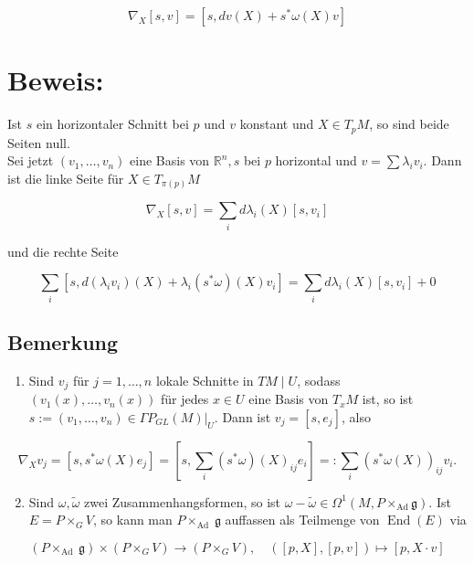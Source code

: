 \documentclass[10pt, letterpaper]{article}
\begin{document}
$$
\nabla_{X}[s, v]=\left[s, d v(X)+s^{*} \omega(X) v\right]
$$

\section*{Beweis:}
Ist $s$ ein horizontaler Schnitt bei $p$ und $v$ konstant und $X \in T_{p} M$, so sind beide Seiten null.\\
Sei jetzt $\left(v_{1}, \ldots, v_{n}\right)$ eine Basis von $\mathbb{R}^{n}, s$ bei $p$ horizontal und $v=\sum \lambda_{i} v_{i}$. Dann ist die linke Seite für $X \in T_{\pi(p)} M$

$$
\nabla_{X}[s, v]=\sum_{i} d \lambda_{i}(X)\left[s, v_{i}\right]
$$

und die rechte Seite

$$
\sum_{i}\left[s, d\left(\lambda_{i} v_{i}\right)(X)+\lambda_{i}\left(s^{*} \omega\right)(X) v_{i}\right]=\sum_{i} d \lambda_{i}(X)\left[s, v_{i}\right]+0
$$

\subsection*{Bemerkung}
\begin{enumerate}
  \item Sind $v_{j}$ für $j=1, \ldots, n$ lokale Schnitte in $T M \mid U$, sodass $\left(v_{1}(x), \ldots, v_{n}(x)\right)$ für jedes $x \in U$ eine Basis von $T_{x} M$ ist, so ist $s:=\left(v_{1}, \ldots, v_{n}\right) \in \left.\Gamma P_{G L}(M)\right|_{U}$. Dann ist $v_{j}=\left[s, e_{j}\right]$, also
\end{enumerate}

$$
\nabla_{X} v_{j}=\left[s, s^{*} \omega(X) e_{j}\right]=\left[s, \sum_{i}\left(s^{*} \omega\right)(X)_{i j} e_{i}\right]=: \sum_{i}\left(s^{*} \omega(X)\right)_{i j} v_{i} .
$$

\begin{enumerate}
  \setcounter{enumi}{1}
  \item Sind $\omega, \tilde{\omega}$ zwei Zusammenhangsformen, so ist $\omega-\tilde{\omega} \in \Omega^{1}\left(M, P \times_{\mathrm{Ad}} \mathfrak{g}\right)$. Ist $E=P \times_{G} V$, so kann man $P \times_{\text {Ad }} \mathfrak{g}$ auffassen als Teilmenge von $\operatorname{End}(E)$ via
\end{enumerate}

$$
\left(P \times_{\text {Ad }} \mathfrak{g}\right) \times\left(P \times_{G} V\right) \rightarrow\left(P \times_{G} V\right), \quad([p, X],[p, v]) \mapsto[p, X \cdot v]
$$
\end{document}
